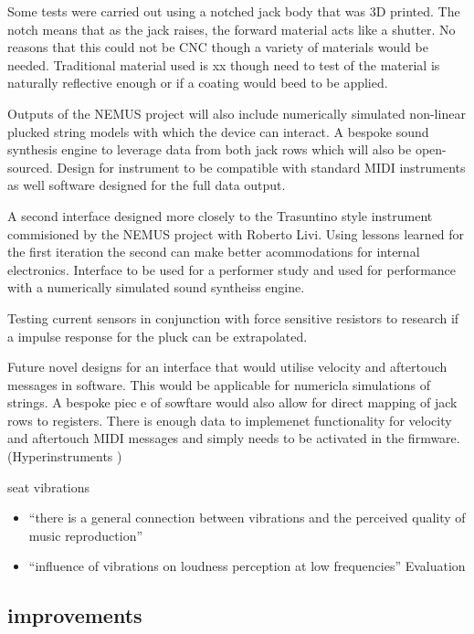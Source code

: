 Some tests were carried out using a notched jack body that was 3D
printed. The notch means that as the jack raises, the forward material
acts like a shutter. No reasons that this could not be CNC though a
variety of materials would be needed. Traditional material used is xx
though need to test of the material is naturally reflective enough or if
a coating would beed to be applied.

Outputs of the NEMUS project will also include numerically simulated
non-linear plucked string models with which the device can interact. A
bespoke sound synthesis engine to leverage data from both jack rows
which will also be open-sourced. Design for instrument to be compatible
with standard MIDI instruments as well software designed for the full
data output.

A second interface designed more closely to the Trasuntino style
instrument commisioned by the NEMUS project with Roberto Livi. Using
lessons learned for the first iteration the second can make better
acommodations for internal electronics. Interface to be used for a
performer study and used for performance with a numerically simulated
sound syntheiss engine.

Testing current sensors in conjunction with force sensitive resistors to
research if a impulse response for the pluck can be extrapolated.

Future novel designs for an interface that would utilise velocity and
aftertouch messages in software. This would be applicable for numericla
simulations of strings. A bespoke piec e of sowftare would also allow
for direct mapping of jack rows to registers. There is enough data to
implemenet functionality for velocity and aftertouch MIDI messages and
simply needs to be activated in the firmware. (Hyperinstruments
\cite{nime2024_20})

seat vibrations \cite{MusicalHaptics2018_07}

\begin{itemize}
\item
  ``there is a general connection between vibrations and the perceived
  quality of music reproduction''
\item
  ``influence of vibrations on loudness perception at low frequencies''
  Evaluation
\end{itemize}

\subsection{improvements}\label{improvements}

